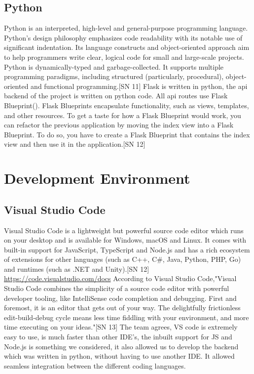 \subsection{Python}
Python is an interpreted, high-level and general-purpose programming language. Python's design philosophy emphasizes code readability with its notable use of significant indentation. Its language constructs and object-oriented approach aim to help programmers write clear, logical code for small and large-scale projects.
Python is dynamically-typed and garbage-collected. It supports multiple programming paradigms, including structured (particularly, procedural), object-oriented and functional programming.[SN 11]
Flask is written in python, the api backend of the project is written on python code. All api routes use Flask Blueprint().
Flask Blueprints encapsulate functionality, such as views, templates, and other resources. To get a taste for how a Flask Blueprint would work, you can refactor the previous application by moving the index view into a Flask Blueprint. To do so, you have to create a Flask Blueprint that contains the index view and then use it in the application.[SN 12]

\section{Development Environment}
\subsection{Visual Studio Code}
Visual Studio Code is a lightweight but powerful source code editor which runs on your desktop and is available for Windows, macOS and Linux. It comes with built-in support for JavaScript, TypeScript and Node.js and has a rich ecosystem of extensions for other languages (such as C++, C\#, Java, Python, PHP, Go) and runtimes (such as .NET and Unity).[SN 12] \url{https://code.visualstudio.com/docs}
According to Visual Studio Code,"Visual Studio Code combines the simplicity of a source code editor with powerful developer tooling, like IntelliSense code completion and debugging.
First and foremost, it is an editor that gets out of your way. The delightfully frictionless edit-build-debug cycle means less time fiddling with your environment, and more time executing on your ideas."[SN 13]
\vspace{5mm}
The team agrees, VS code is extremely easy to use, is much faster than other IDE's, the inbuilt support for JS and Node.js is something we considered, it also allowed us to develop the backend which was written in python, without having to use another IDE. It allowed seamless integration between the different coding languages.


